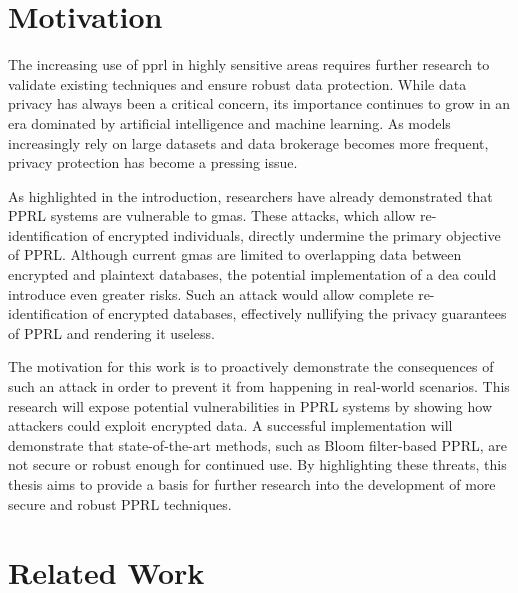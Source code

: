 \section{Motivation}  \label{sec:motivation}
The increasing use of \ac{pprl} in highly sensitive areas requires further research to validate existing techniques and ensure robust data protection.
While data privacy has always been a critical concern, its importance continues to grow in an era dominated by artificial intelligence and machine learning.
As models increasingly rely on large datasets and data brokerage becomes more frequent, privacy protection has become a pressing issue.

As highlighted in the introduction, researchers have already demonstrated that PPRL systems are vulnerable to \ac{gma}s.
These attacks, which allow re-identification of encrypted individuals, directly undermine the primary objective of PPRL.
Although current \ac{gma}s are limited to overlapping data between encrypted and plaintext databases, the potential implementation of a \ac{dea} could introduce even greater risks.
Such an attack would allow complete re-identification of encrypted databases, effectively nullifying the privacy guarantees of PPRL and rendering it useless.

The motivation for this work is to proactively demonstrate the consequences of such an attack in order to prevent it from happening in real-world scenarios.
This research will expose potential vulnerabilities in PPRL systems by showing how attackers could exploit encrypted data.
A successful implementation will demonstrate that state-of-the-art methods, such as Bloom filter-based PPRL, are not secure or robust enough for continued use.
By highlighting these threats, this thesis aims to provide a basis for further research into the development of more secure and robust PPRL techniques.

\section{Related Work}  \label{sec:rel-work}


